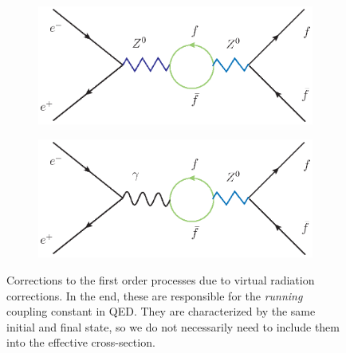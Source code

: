 \begin{figure}[htpb]
\centering
\begin{subfigure}{.5\textwidth}
  \centering
  \includegraphics[width=1.0\linewidth]{figures/corr3}
  \label{fig:sub1}
\end{subfigure}%
\begin{subfigure}{.5\textwidth}
  \centering
  \includegraphics[width=1.0\linewidth]{figures/corr4}
  \label{fig:sub2}
\end{subfigure}
\caption{Corrections to the first order processes due to virtual radiation corrections. In the end, these are responsible
for the \textit{running} coupling constant in QED. They are characterized by the same initial and final state, so we
do not necessarily need to include them into the effective cross-section.}
\label{fig:photonic2}
\end{figure}

